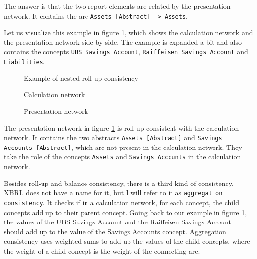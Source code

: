 The answer is that the two report elements are related by the presentation network.
It contains the arc \texttt{Assets [Abstract] -> Assets}.

Let us visualize this example in figure \ref{fig:example_roll_up_consistency}, 
which shows the calculation network and the presentation network side by side.
The example is expanded a bit and also contains the concepts \texttt{UBS Savings Account}, \texttt{Raiffeisen Savings Account} and \texttt{Liabilities}.

\begin{figure}[H]
    \caption{Example of nested roll-up consistency}
    \label{fig:example_roll_up_consistency}
    \begin{minipage}{0.8\textwidth}
        \caption{Calculation network}
    \end{minipage}
    \begin{minipage}{0.8\textwidth}
        \caption{Presentation network}
    \end{minipage}
\end{figure}

The presentation network in figure \ref{fig:example_roll_up_consistency} is roll-up consistent with the calculation network.
It contains the two abstracts \texttt{Assets [Abstract]} and \texttt{Savings Accounts [Abstract]}, 
which are not present in the calculation network. 
They take the role of the concepts \texttt{Assets} and \texttt{Savings Accounts} in the calculation network.

Besides roll-up and balance consistency, there is a third kind of consistency. 
XBRL does not have a name for it, but I will refer to it as \texttt{aggregation consistency}.
It checks if in a calculation network, for each concept, the child concepts add up to their parent concept.
Going back to our example in figure \ref{fig:example_roll_up_consistency},
the values of the UBS Savings Account and the Raiffeisen Savings Account should add up to the value of the Savings Accounts concept.
Aggregation consistency uses weighted sums to add up the values of the child concepts, 
where the weight of a child concept is the weight of the connecting arc.

